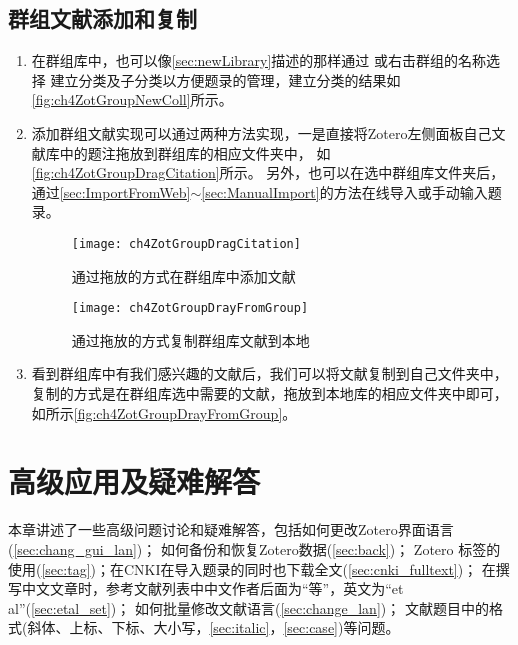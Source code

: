 \documentclass[cn,11pt,chinese]{elegantbook}
\begin{document}
\section{群组文献添加和复制}\label{sec:copyGroupLibrary}
\begin{enumerate}
	\item 在群组库中，也可以像\cref{sec:newLibrary}描述的那样通过
	或右击群组的名称选择
	建立分类及子分类以方便题录的管理，建立分类的结果如\autoref{fig:ch4ZotGroupNewColl}所示。
	\item 添加群组文献实现可以通过两种方法实现，一是直接将Zotero左侧面板自己文献库中的题注拖放到群组库的相应文件夹中，
	如\autoref{fig:ch4ZotGroupDragCitation}所示。
	另外，也可以在选中群组库文件夹后，通过\cref{sec:ImportFromWeb}$\sim$\cref{sec:ManualImport}的方法在线导入或手动输入题录。
		\begin{figure}[htbp]
			\centering
			\texttt{[image: ch4ZotGroupDragCitation]}
			\caption{通过拖放的方式在群组库中添加文献}
			\label{fig:ch4ZotGroupDragCitation}
		\end{figure}

			\begin{figure}[htbp]
			\centering
			\texttt{[image: ch4ZotGroupDrayFromGroup]}
			\caption{通过拖放的方式复制群组库文献到本地}
			\label{fig:ch4ZotGroupDrayFromGroup}
			\end{figure}
		\item 看到群组库中有我们感兴趣的文献后，我们可以将文献复制到自己文件夹中，
		复制的方式是在群组库选中需要的文献，拖放到本地库的相应文件夹中即可，
		如所示\autoref{fig:ch4ZotGroupDrayFromGroup}。
	\end{enumerate}

  \chapter{高级应用及疑难解答}\label{ch:questions}
	本章讲述了一些高级问题讨论和疑难解答，包括如何更改Zotero界面语言(\cref{sec:chang_gui_lan})；
	如何备份和恢复Zotero数据(\cref{sec:back})；
	Zotero 标签的使用(\cref{sec:tag})；在CNKI在导入题录的同时也下载全文(\cref{sec:cnki_fulltext})；
	在撰写中文文章时，参考文献列表中中文作者后面为“等”，英文为“et al”(\cref{sec:etal_set})；
	如何批量修改文献语言(\cref{sec:change_lan})；
	文献题目中的格式(斜体、上标、下标、大小写，\cref{sec:italic}，\cref{sec:case})等问题。
	
\end{document}
